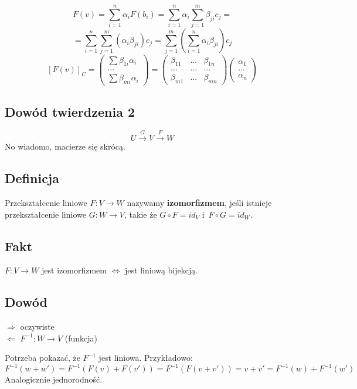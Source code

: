 \documentclass{article}
\begin{document}
    \[F(v)=\sum_{i=1}^n\alpha_iF(b_i)=\sum_{i=1}^n\alpha_i\sum_{j=1}^m\beta_{ji}c_j=\]
    \[=\sum_{i=1}^n\sum_{j=1}^m(\alpha_i\beta_{ji})c_j=\sum_{j=1}^m\left(\sum_{i=1}^n\alpha_i\beta_{ji}\right)c_j\]
    \[[F(v)]_C=\begin{pmatrix}\sum\beta_{1i}\alpha_i\\...\\\sum\beta_{mi}\alpha_i\end{pmatrix}=
      \begin{pmatrix}\beta_{11}&...&\beta_{1n}\\...&...&...\\\beta_{m1}&...&\beta_{mn}\end{pmatrix}
        \begin{pmatrix}\alpha_1\\...\\\alpha_n\end{pmatrix}\]


  \subsection*{Dowód twierdzenia 2}
  \[U \overset{G}{\longrightarrow} V \overset{F}{\longrightarrow} W\]
  No wiadomo, macierze się skrócą.

  \subsection*{Definicja}
  Przekształcenie liniowe $F: V \rightarrow W$ nazywamy
  \textbf{izomorfizmem}, jeśli istnieje przekształcenie
  liniowe $G: W\rightarrow V$, takie że $G\circ F = id_V$
  i~$F\circ G=id_W$.

  \subsection*{Fakt}
  $F: V \rightarrow W$ jest izomorfizmem $\Leftrightarrow$ jest liniową
  bijekcją.

  \subsection*{Dowód}
  $\Rightarrow$ oczywiste\\
  $\Leftarrow$ $F^{-1}: W \rightarrow V$ (funkcja)

  Potrzeba pokazać, że $F^{-1}$ jest liniowa. Przykładowo:
  \[F^{-1}(w+w')=F^{-1}(F(v)+F(v'))=F^{-1}(F(v+v'))=v+v'=F^{-1}(w)+F^{-1}(w')\]
  Analogicznie jednorodność.
\end{document}
